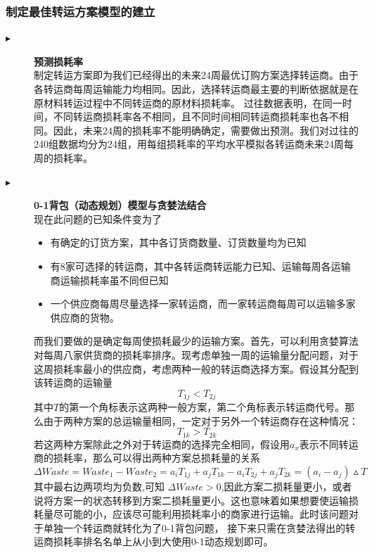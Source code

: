 \documentclass[withoutpreface,bwprint]{cumcmthesis}
\begin{document}
\subsubsection*{制定最佳转运方案模型的建立}
\begin{description}
    \item[$\blacktriangleright$]\textbf{预测损耗率}  \\
    制定转运方案即为我们已经得出的未来24周最优订购方案选择转运商。由于各转运商每周运输能力均相同。因此，选择转运商最主要的判断依据就是在原材料转运过程中不同转运商的原材料损耗率。
    过往数据表明，在同一时间，不同转运商损耗率各不相同，且不同时间相同转运商损耗率也各不相同。因此，未来24周的损耗率不能明确确定，需要做出预测。我们对过往的240组数据均分为24组，用每组损耗率的平均水平模拟各转运商未来24周每周的损耗率。
    \item[$\blacktriangleright$]\textbf{0-1背包（动态规划）模型与贪婪法结合}\\
    现在此问题的已知条件变为了
    \begin{itemize}
        \item 有确定的订货方案，其中各订货商数量、订货数量均为已知
        \item 有8家可选择的转运商，其中各转运商转运能力已知、运输每周各运输商运输损耗率虽不同但已知
        \item 一个供应商每周尽量选择一家转运商，而一家转运商每周可以运输多家供应商的货物。
    \end{itemize}
    而我们要做的是确定每周使损耗最少的运输方案。首先，可以利用贪婪算法对每周八家供货商的损耗率排序。现考虑单独一周的运输量分配问题，对于这周损耗率最小的供应商，考虑两种一般的转运商选择方案。假设其分配到该转运商的运输量
    \begin{equation}
        T_{1j}<T_{2j}\nonumber
    \end{equation}
    其中$T$的第一个角标表示这两种一般方案，第二个角标表示转运商代号。那么由于两种方案的总运输量相同，一定对于另外一个转运商存在这种情况：
    \begin{equation}
        T_{1k}>T_{2k}\nonumber
    \end{equation}
    若这两种方案除此之外对于转运商的选择完全相同，假设用$a_{x}$表示不同转运商的损耗率，那么可以得出两种方案总损耗量的关系
    \begin{equation}
        \Delta Waste= Waste_1-Waste_2=a_i T_{1j}+ a_j T_{1k}-a_i T_{2j} + a_j T_{2k}=(a_i-a_j)\vartriangle T\nonumber
    \end{equation}
    其中最右边两项均为负数,可知 $\Delta Waste >0$,因此方案二损耗量更小，或者说将方案一的状态转移到方案二损耗量更小。这也意味着如果想要使运输损耗量尽可能的小，应该尽可能利用损耗率小的商家进行运输。此时该问题对于单独一个转运商就转化为了0-1背包问题，
    接下来只需在贪婪法得出的转运商损耗率排名名单上从小到大使用0-1动态规划即可。
\end{description}
\end{document}
